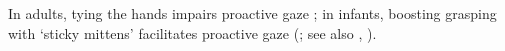 \documentclass[12pt]{extarticle}
\begin{document}
\begin{multicols}{3}
In adults, tying the hands impairs proactive gaze \citep{ambrosini:2012_tie}; in
infants, boosting grasping with ‘sticky mittens’ facilitates proactive gaze
(\citealp{sommerville:2005_action}; see also \citealp{sommerville:2008_experience},
\citealp{ambrosini:2013_looking}).


    



\footnotesize


\end{multicols}
\end{document}

